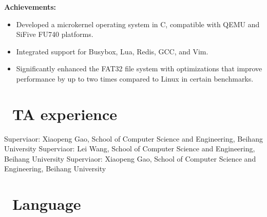 \documentclass{resume}
\begin{document}

\textbf{Achievements:}
\begin{itemize}
  \item Developed a microkernel operating system in C, compatible with QEMU and SiFive FU740 platforms.
  \item Integrated support for Busybox, Lua, Redis, GCC, and Vim.
  \item Significantly enhanced the FAT32 file system with optimizations that improve performance by up to two times compared to Linux in certain benchmarks.
\end{itemize}



\section{\faHeartO\ TA experience}
Superviaor: Xiaopeng Gao, School of Computer Science and Engineering, Beihang University
Superviaor: Lei Wang, School of Computer Science and Engineering, Beihang University
Superviaor: Xiaopeng Gao, School of Computer Science and Engineering, Beihang University


\section{\faCertificate\ Language}


%
%
\end{document}

